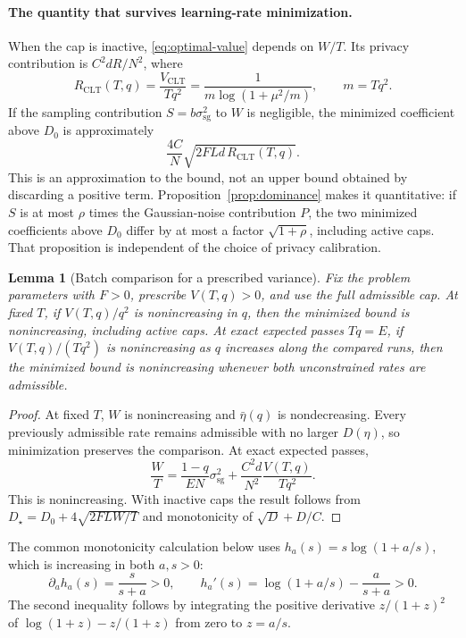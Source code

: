 \documentclass[11pt]{article}
\newtheorem{lemma}[theorem]{Lemma}
\newcommand{\sg}{\mathrm{sg}}
\begin{document}
\paragraph{The quantity that survives learning-rate minimization.}
When the cap is inactive, \eqref{eq:optimal-value} depends on $W/T$.
Its privacy contribution is $C^2dR/N^2$, where
\begin{equation}\label{eq:clt-normalization}
 R_{\mathrm{CLT}}(T,q)
 =\frac{V_{\mathrm{CLT}}}{Tq^2}
 =\frac{1}{m\log(1+\mu^2/m)},\qquad m=Tq^2.
\end{equation}
If the sampling contribution $S=b\sigma_{\sg}^2$ to $W$ is negligible, the minimized coefficient above $D_0$
is approximately
\[
 \frac{4C}{N}\sqrt{2FLd\,R_{\mathrm{CLT}}(T,q)}.
\]
This is an approximation to the bound, not an upper bound obtained by
discarding a positive term. Proposition~\ref{prop:dominance} makes it
quantitative: if $S$ is at most $\rho$ times the Gaussian-noise contribution $P$,
the two minimized coefficients above $D_0$ differ by at most a factor
$\sqrt{1+\rho}$, including active caps. That proposition is independent of
the choice of privacy calibration.

\begin{lemma}[Batch comparison for a prescribed variance]\label{lem:batch-general}
Fix the problem parameters with $F>0$, prescribe $V(T,q)>0$, and use the
full admissible cap.
At fixed $T$, if $V(T,q)/q^2$ is nonincreasing in $q$, then the minimized
bound is nonincreasing, including active caps.
At exact expected passes $Tq=E$, if $V(T,q)/(Tq^2)$ is nonincreasing
as $q$ increases along the compared runs, then the minimized bound is nonincreasing
whenever both unconstrained rates are admissible.
\end{lemma}
\begin{proof}
At fixed $T$, $W$ is nonincreasing and $\bar\eta(q)$ is nondecreasing.
Every previously admissible rate remains admissible with no larger
$D(\eta)$, so minimization preserves the comparison.
At exact expected passes,
\[
 \frac WT=\frac{1-q}{EN}\sigma_{\sg}^2+
 \frac{C^2d}{N^2}\frac{V(T,q)}{Tq^2}.
\]
This is nonincreasing. With inactive caps the result follows from
$D_\star=D_0+4\sqrt{2FLW/T}$ and monotonicity of $\sqrt D+D/C$.
\end{proof}

The common monotonicity calculation below uses
$h_a(s)=s\log(1+a/s)$, which is increasing in both $a,s>0$:
\begin{equation}\label{eq:log-perspective}
 \partial_a h_a(s)=\frac{s}{s+a}>0,\qquad
 h_a'(s)=\log(1+a/s)-\frac{a}{s+a}>0.
\end{equation}
The second inequality follows by integrating the positive derivative
$z/(1+z)^2$ of $\log(1+z)-z/(1+z)$ from zero to $z=a/s$.
\end{document}
